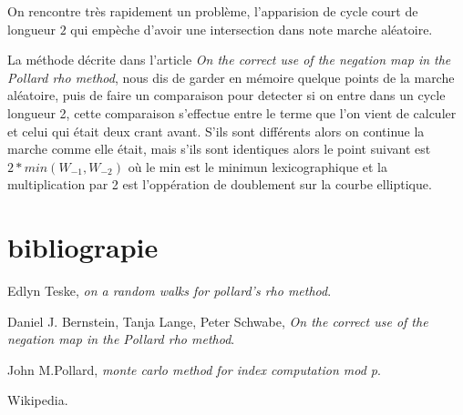 \documentclass[a4paper,10pt]{report}
\newcommand{\article}{\textit{On the correct use of the negation map in the Pollard rho method}}
\begin{document}
On rencontre très rapidement un problème, l'apparision de cycle court de longueur $2$ qui empèche d'avoir une intersection dans note marche aléatoire.

La méthode décrite dans l'article \article, nous dis de garder en mémoire quelque points de la marche aléatoire, puis de faire un comparaison pour detecter si on entre dans un cycle
longueur 2, cette comparaison s'effectue entre le terme que l'on vient de calculer et celui qui était deux crant avant.
S'ils sont différents alors on continue la marche comme elle était, mais s'ils sont identiques alors le point suivant est $2*min(W_{-1},W_{-2})$ où le min est le minimun lexicographique et
la multiplication par 2 est l'oppération de doublement sur la courbe elliptique.



\chapter{bibliograpie}
Edlyn Teske, \textit{on a random walks for pollard's rho method}.

Daniel J. Bernstein, Tanja Lange, Peter Schwabe, \article.

John M.Pollard, \textit{monte carlo method for index computation mod p}.

Wikipedia.
\end{document}

